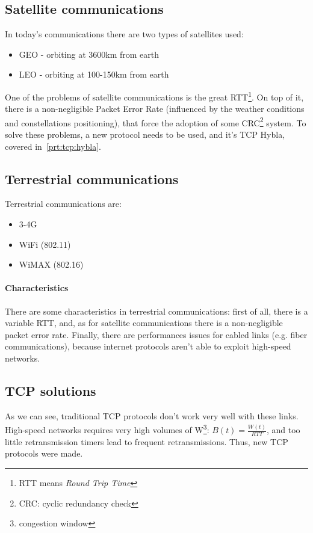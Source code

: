 \subsection{Satellite communications}
In today's communications there are two types of satellites used:
\begin{itemize}
\item GEO - orbiting at 3600km from earth
\item LEO - orbiting at 100-150km from earth
\end{itemize}
One of the problems of satellite communications is the great RTT\footnote{RTT
  means \textit{Round Trip Time}}. On top of it, there is a non-negligible
Packet Error Rate (influenced by the weather conditions and constellations
positioning), that force the adoption of some CRC\footnote{CRC: cyclic
  redundancy check} system.
To solve these problems, a new protocol needs to be used, and it's TCP Hybla,
covered in~\ref{prt:tcp:hybla}.

\subsection{Terrestrial communications}
Terrestrial communications are:
\begin{itemize}
\item 3-4G
\item WiFi (802.11)
\item WiMAX (802.16)
\end{itemize}

\paragraph*{Characteristics} There are some characteristics in terrestrial
communications: first of all, there is a variable RTT, and, as for satellite
communications there is a non-negligible packet error rate. Finally, there are
performances issues for cabled links (e.g. fiber communications), because
internet protocols aren't able to exploit high-speed networks.

\subsection{TCP solutions}

As we can see, traditional TCP protocols don't work very well with these links.
High-speed networks requires very high volumes of W\footnote{congestion
window}: $B(t) = \frac{W(t)}{RTT}$, and too little retransmission timers lead
to frequent retransmissions.
Thus, new TCP protocols were made.

